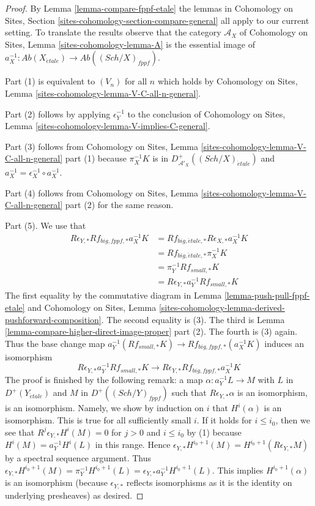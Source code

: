 \documentclass[10pt,a4paper]{amsart}
\theoremstyle{plain}
\theoremstyle{definition}
\theoremstyle{remark}
\numberwithin{equation}{subsection}
\def\Sch{\mathit{Sch}}
\def\etale{{\acute{e}tale}}
\begin{document}
\begin{proof}
By Lemma \ref{lemma-compare-fppf-etale} the lemmas in
Cohomology on Sites, Section \ref{sites-cohomology-section-compare-general}
all apply to our current setting. To translate the results
observe that the category $\mathcal{A}_X$ of
Cohomology on Sites, Lemma \ref{sites-cohomology-lemma-A}
is the essential image of
$a_X^{-1} : \textit{Ab}(X_\etale) \to \textit{Ab}((\Sch/X)_{fppf})$.

\medskip\noindent
Part (1) is equivalent to $(V_n)$ for all $n$ which holds by
Cohomology on Sites, Lemma \ref{sites-cohomology-lemma-V-C-all-n-general}.

\medskip\noindent
Part (2) follows by applying $\epsilon_Y^{-1}$ to the conclusion of
Cohomology on Sites, Lemma \ref{sites-cohomology-lemma-V-implies-C-general}.

\medskip\noindent
Part (3) follows from Cohomology on Sites, Lemma
\ref{sites-cohomology-lemma-V-C-all-n-general} part (1)
because $\pi_X^{-1}K$ is in $D^+_{\mathcal{A}'_X}((\Sch/X)_\etale)$
and $a_X^{-1} = \epsilon_X^{-1} \circ a_X^{-1}$.

\medskip\noindent
Part (4) follows from Cohomology on Sites, Lemma
\ref{sites-cohomology-lemma-V-C-all-n-general} part (2)
for the same reason.

\medskip\noindent
Part (5). We use that
\begin{align*}
R\epsilon_{Y, *}Rf_{big, fppf, *}a_X^{-1}K
& =
Rf_{big, \etale, *}R\epsilon_{X, *}a_X^{-1}K \\
& =
Rf_{big, \etale, *}\pi_X^{-1}K \\
& =
\pi_Y^{-1}Rf_{small, *}K \\
& =
R\epsilon_{Y, *} a_Y^{-1}Rf_{small, *}K
\end{align*}
The first equality by the commutative diagram in
Lemma \ref{lemma-push-pull-fppf-etale}
and Cohomology on Sites, Lemma
\ref{sites-cohomology-lemma-derived-pushforward-composition}.
The second equality is (3). The third is
Lemma \ref{lemma-compare-higher-direct-image-proper} part (2).
The fourth is (3) again. Thus the base change map
$a_Y^{-1}(Rf_{small, *}K) \to Rf_{big, fppf, *}(a_X^{-1}K)$
induces an isomorphism
$$
R\epsilon_{Y, *}a_Y^{-1}Rf_{small, *}K \to
R\epsilon_{Y, *}Rf_{big, fppf, *}a_X^{-1}K
$$
The proof is finished by the following remark: a map
$\alpha : a_Y^{-1}L \to M$ with $L$ in $D^+(Y_\etale)$
and $M$ in $D^+((\Sch/Y)_{fppf})$ such that $R\epsilon_{Y, *}\alpha$
is an isomorphism, is an isomorphism. Namely, 
we show by induction on $i$ that $H^i(\alpha)$ is an isomorphism.
This is true for all sufficiently small $i$.
If it holds for $i \leq i_0$, then we see that
$R^j\epsilon_{Y, *}H^i(M) = 0$ for $j > 0$ and $i \leq i_0$
by (1) because $H^i(M) = a_Y^{-1}H^i(L)$ in this range.
Hence $\epsilon_{Y, *}H^{i_0 + 1}(M) = H^{i_0 + 1}(R\epsilon_{Y, *}M)$
by a spectral sequence argument.
Thus $\epsilon_{Y, *}H^{i_0 + 1}(M) = \pi_Y^{-1}H^{i_0 + 1}(L) =
\epsilon_{Y, *}a_Y^{-1}H^{i_0 + 1}(L)$.
This implies $H^{i_0 + 1}(\alpha)$ is an isomorphism
(because $\epsilon_{Y, *}$ reflects isomorphisms as it is the
identity on underlying presheaves) as desired.
\end{proof}
\end{document}
